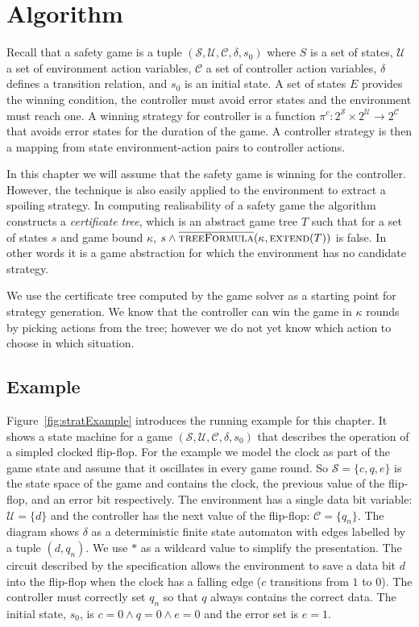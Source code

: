 \section{Algorithm}

Recall that a safety game is a tuple $(\mathcal{S}, \mathcal{U}, \mathcal{C}, \delta, s_0)$ where $S$ is a set of states, $\mathcal{U}$ a set of environment action variables, $\mathcal{C}$ a set of controller action variables, $\delta$ defines a transition relation, and $s_0$ is an initial state. A set of states $E$ provides the winning condition, the controller must avoid error states and the environment must reach one. A winning strategy for controller is a function $\pi^c : 2^{\mathcal{S}} \times 2^{\mathcal{U}} \to 2^{\mathcal{C}}$ that avoids error states for the duration of the game. A controller strategy is then a mapping from state environment-action pairs to controller actions.

In this chapter we will assume that the safety game is winning for the controller. However, the technique is also easily applied to the environment to extract a spoiling strategy. In computing realisability of a safety game the algorithm constructs a \emph{certificate tree}, which is an abstract game tree $T$ such that for a set of states $s$ and game bound $\kappa$, $s \land \textsc{$\overline{\mbox{treeFormula}}$}(\kappa, \textsc{extend}(T))$ is false. In other words it is a game abstraction for which the environment has no candidate strategy.

We use the certificate tree computed by the game solver as a starting point for strategy generation.  We know that the controller can win the game in $\kappa$ rounds by picking actions from the tree; however we do not yet know which action to choose in which situation.


\subsection{Example}

Figure~\ref{fig:stratExample} introduces the running example for this chapter. It shows a state machine for a game $(\mathcal{S}, \mathcal{U}, \mathcal{C}, \delta, s_0)$ that describes the operation of a simpled clocked flip-flop. For the example we model the clock as part of the game state and assume that it oscillates in every game round. So $\mathcal{S} = \{ c, q, e \}$ is the state space of the game and contains the clock, the previous value of the flip-flop, and an error bit respectively. The environment has a single data bit variable: $\mathcal{U} = \{ d \}$ and the controller has the next value of the flip-flop: $\mathcal{C} = \{ q_n \}$. The diagram shows $\delta$ as a deterministic finite state automaton with edges labelled by a tuple $(d, q_n)$. We use $*$ as a wildcard value to simplify the presentation. The circuit described by the specification allows the environment to save a data bit $d$ into the flip-flop when the clock has a falling edge ($c$ transitions from $1$ to $0$). The controller must correctly set $q_n$ so that $q$ always contains the correct data. The initial state, $s_0$, is $c = 0 \land q = 0 \land e = 0$ and the error set is $e = 1$.

